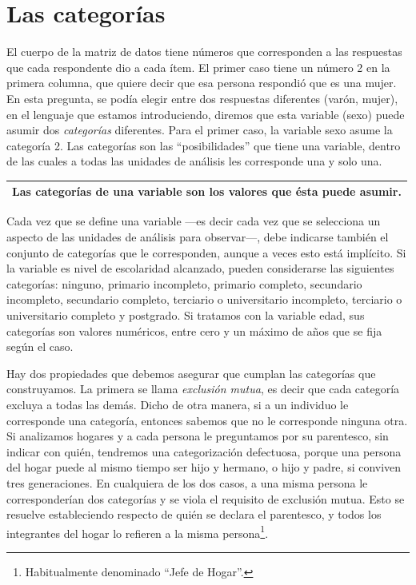 \documentclass[]{book}
\let\rmarkdownfootnote\footnote%
\def\footnote{\protect\rmarkdownfootnote}
\begin{document}
\hypertarget{las-categorias}{%
\section{Las categorías}\label{las-categorias}}

El cuerpo de la matriz de datos tiene números que corresponden a las respuestas que cada respondente dio a cada ítem. El primer caso tiene un número 2 en la primera columna, que quiere decir que esa persona respondió que es una mujer. En esta pregunta, se podía elegir entre dos respuestas diferentes (varón, mujer), en el lenguaje que estamos introduciendo, diremos que esta variable (sexo) puede asumir dos \emph{categorías} diferentes. Para el primer caso, la variable sexo asume la categoría 2. Las categorías son las ``posibilidades'' que tiene una variable, dentro de las cuales a todas las unidades de análisis les corresponde una y solo una.

\begin{longtable}[]{@{}c@{}}
\toprule
\endhead
Las \textbf{categorías} de una variable son los valores que ésta puede asumir.\tabularnewline
\bottomrule
\end{longtable}

Cada vez que se define una variable ---es decir cada vez que se selecciona un aspecto de las unidades de análisis para observar---, debe indicarse también el conjunto de categorías que le corresponden, aunque a veces esto está implícito. Si la variable es nivel de escolaridad alcanzado, pueden considerarse las siguientes categorías: ninguno, primario incompleto, primario completo, secundario incompleto, secundario completo, terciario o universitario incompleto, terciario o universitario completo y postgrado. Si tratamos con la variable edad, sus categorías son valores numéricos, entre cero y un máximo de años que se fija según el caso.

Hay dos propiedades que debemos asegurar que cumplan las categorías que construyamos. La primera se llama \emph{exclusión mutua}, es decir que cada categoría excluya a todas las demás. Dicho de otra manera, si a un individuo le corresponde una categoría, entonces sabemos que no le corresponde ninguna otra. Si analizamos hogares y a cada persona le preguntamos por su parentesco, sin indicar con quién, tendremos una categorización defectuosa, porque una persona del hogar puede al mismo tiempo ser hijo y hermano, o hijo y padre, si conviven tres generaciones. En cualquiera de los dos casos, a una misma persona le corresponderían dos categorías y se viola el requisito de exclusión mutua. Esto se resuelve estableciendo respecto de quién se declara el parentesco, y todos los integrantes del hogar lo refieren a la misma persona\footnote{Habitualmente denominado ``Jefe de Hogar''.}.
\end{document}
